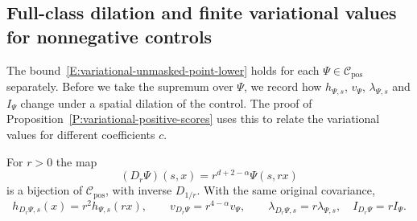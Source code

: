 \subsection{Full-class dilation and finite variational values for nonnegative controls}

The bound~\eqref{E:variational-unmasked-point-lower} holds for each $\Psi \in
\mathcal{C}_{\mathrm{pos}}$ separately. Before we take the supremum over $\Psi$,
we record how $h_{\Psi,s}$, $v_\Psi$, $\lambda_{\Psi,s}$ and $I_\Psi$ change
under a spatial dilation of the control. The proof of
Proposition~\ref{P:variational-positive-scores} uses this to relate the
variational values for different coefficients $c$.

\begin{lemma}\label{L:variational-control-dilation}
  For $r > 0$ the map
  \begin{equation}\label{E:variational-control-dilation}
    (D_r\Psi)(s,x)=r^{d+2-\alpha}\Psi(s,rx)
  \end{equation}
  is a bijection of $\mathcal{C}_{\mathrm{pos}}$, with inverse $D_{1/r}$. With
  the same original covariance,
  \begin{equation}\label{E:variational-dilation-values}
    h_{D_r\Psi,s}(x)=r^2h_{\Psi,s}(rx),\qquad
    v_{D_r\Psi}=r^{4-\alpha}v_\Psi,\qquad
    \lambda_{D_r\Psi,s}=r\lambda_{\Psi,s},\quad
    I_{D_r\Psi}=rI_\Psi.
  \end{equation}
\end{lemma}

